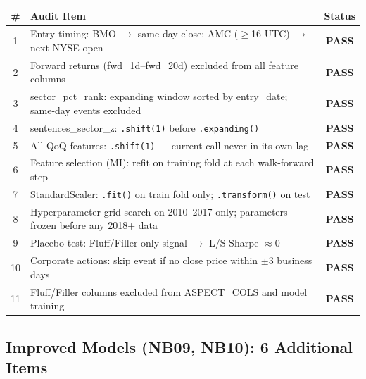 \documentclass[11pt,a4paper]{article}
\begin{document}
\begin{center}
\begin{tabular}{clc}
\toprule
\# & Audit Item & Status\\
\midrule
1  & Entry timing: BMO $\to$ same-day close; AMC ($\ge$16 UTC) $\to$ next NYSE open & \textcolor{signalgreen}{\textbf{PASS}}\\
2  & Forward returns (fwd\_1d--fwd\_20d) excluded from all feature columns & \textcolor{signalgreen}{\textbf{PASS}}\\
3  & sector\_pct\_rank: expanding window sorted by entry\_date; same-day events excluded & \textcolor{signalgreen}{\textbf{PASS}}\\
4  & sentences\_sector\_z: \texttt{.shift(1)} before \texttt{.expanding()} & \textcolor{signalgreen}{\textbf{PASS}}\\
5  & All QoQ features: \texttt{.shift(1)} --- current call never in its own lag & \textcolor{signalgreen}{\textbf{PASS}}\\
6  & Feature selection (MI): refit on training fold at each walk-forward step & \textcolor{signalgreen}{\textbf{PASS}}\\
7  & StandardScaler: \texttt{.fit()} on train fold only; \texttt{.transform()} on test & \textcolor{signalgreen}{\textbf{PASS}}\\
8  & Hyperparameter grid search on 2010--2017 only; parameters frozen before any 2018+ data & \textcolor{signalgreen}{\textbf{PASS}}\\
9  & Placebo test: Fluff/Filler-only signal $\to$ L/S Sharpe $\approx 0$ & \textcolor{signalgreen}{\textbf{PASS}}\\
10 & Corporate actions: skip event if no close price within $\pm$3 business days & \textcolor{signalgreen}{\textbf{PASS}}\\
11 & Fluff/Filler columns excluded from ASPECT\_COLS and model training & \textcolor{signalgreen}{\textbf{PASS}}\\
\bottomrule
\end{tabular}
\end{center}

\subsection{Improved Models (NB09, NB10): 6 Additional Items}
\end{document}
